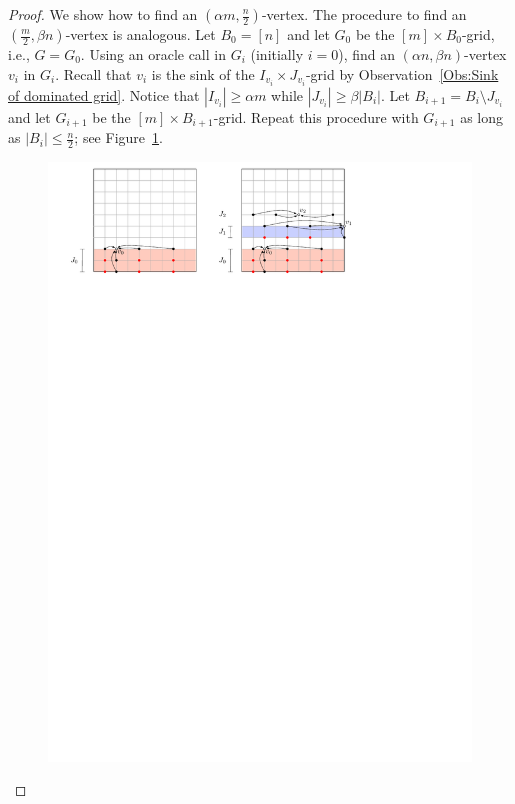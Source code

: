 \documentclass[a4paper,10pt]{article}
\begin{document}
\begin{proof}
We show how to find an $(\alpha m,  \frac{n}{2})$-vertex. The procedure to find an $( \frac{m}{2}, \beta n)$-vertex is analogous.
Let $B_0 = [n]$ and let $G_0$ be the $[m]\times B_0$-grid, i.e., $G = G_0$.
Using an oracle call in $G_i$ (initially $i = 0$), find an $(\alpha n, \beta n)$-vertex $v_i$ in $G_i$. 
Recall that $v_i$ is the sink of the $I_{v_i}\times J_{v_i}$-grid by Observation~\ref{Obs:Sink of dominated grid}.
Notice that $|I_{v_i}| \geq \alpha m$ while $|J_{v_i}| \geq \beta |B_i|$.
Let $B_{i+1} = B_i\setminus J_{v_i}$ and let $G_{i+1}$ be the $[m]\times B_{i+1}$-grid. 
Repeat this procedure with $G_{i+1}$ as long as $|B_i| \leq  \frac{n}{2}$; see Figure~\ref{fig:Climbing Lemma}.

\begin{figure}[h]
\centering
\includegraphics[width=1\textwidth]{ClimbingLemma.pdf}
\caption{\small }
\label{fig:Climbing Lemma}
\end{figure}


\end{proof}
\end{document}
